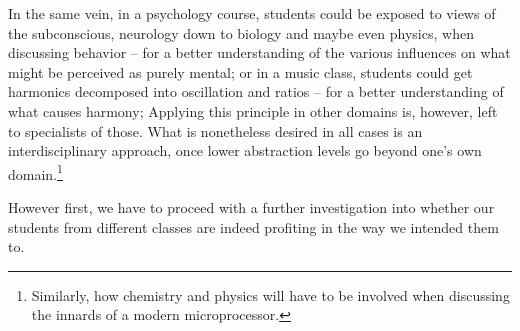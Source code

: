 In the same vein, in a psychology course, students could be exposed to views of the subconscious, neurology down to biology and maybe even physics, when discussing behavior -- for a better understanding of the various influences on what might be perceived as purely mental; or in a music class, students could get harmonics decomposed into oscillation and ratios -- for a better understanding of what causes harmony; \etc Applying this principle in other domains is, however, left to specialists of those. What is nonetheless desired in all cases is an interdisciplinary approach, once lower abstraction levels go beyond one's own domain.\footnote{Similarly, how chemistry and physics will have to be involved when discussing the innards of a modern microprocessor.}

However first, we have to proceed with a further investigation into whether our students from different classes are indeed profiting in the way we intended them to.
